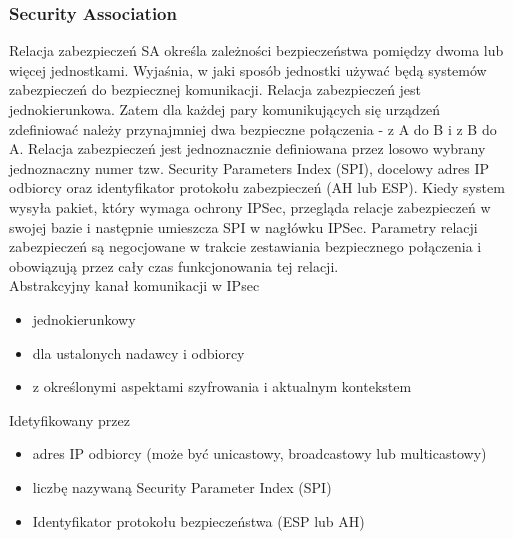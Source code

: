 \documentclass[main.tex]{subfiles}
\begin{document}
    \subsubsection{Security Association}
    Relacja zabezpieczeń SA określa zależności bezpieczeństwa pomiędzy dwoma lub więcej jednostkami. Wyjaśnia, w jaki sposób jednostki używać będą systemów zabezpieczeń do bezpiecznej komunikacji. Relacja zabezpieczeń jest jednokierunkowa. Zatem dla każdej pary komunikujących się urządzeń zdefiniować należy przynajmniej dwa bezpieczne połączenia - z A do B i z B do A. Relacja zabezpieczeń jest jednoznacznie definiowana przez losowo wybrany jednoznaczny numer tzw. Security Parameters Index (SPI), docelowy adres IP odbiorcy oraz identyfikator protokołu zabezpieczeń (AH lub ESP). Kiedy system wysyła pakiet, który wymaga ochrony IPSec, przegląda relacje zabezpieczeń w swojej bazie i następnie umieszcza SPI w nagłówku IPSec. Parametry relacji zabezpieczeń są negocjowane w trakcie zestawiania bezpiecznego połączenia i obowiązują przez cały czas funkcjonowania tej relacji.\\

    Abstrakcyjny kanał komunikacji w IPsec
    \begin{itemize}
        \item jednokierunkowy
        \item dla ustalonych nadawcy i odbiorcy
        \item z określonymi aspektami szyfrowania i aktualnym kontekstem
    \end{itemize}

    Idetyfikowany przez
    \begin{itemize}
        \item adres IP odbiorcy (może być unicastowy, broadcastowy lub multicastowy)
        \item liczbę nazywaną Security Parameter Index (SPI)
        \item Identyfikator protokołu bezpieczeństwa (ESP lub AH)
    \end{itemize}
\end{document}
